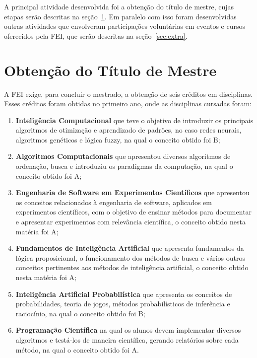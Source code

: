 \documentclass[
  12pt,       %
  oneside,
  a4paper,      %
  english,      %
  french,       %
  spanish,      %
  brazil,       %
  ]{abntex2}
\begin{document}
A principal atividade desenvolvida foi a obtenção do título de mestre, cujas etapas serão descritas na seção~\ref{sec:projeto}.
Em paralelo com isso foram desenvolvidas outras atividades que envolveram participações voluntárias em eventos e cursos oferecidos pela FEI, que serão descritas na seção~\ref{sec:extra}.

\section{Obtenção do Título de Mestre}\label{sec:projeto}

A FEI exige, para concluir o mestrado, a obtenção de seis créditos em disciplinas.
Esses créditos foram obtidas no primeiro ano, onde as disciplinas cursadas foram:
%
\begin{enumerate}
  \item \textbf{Inteligência Computacional} que teve o objetivo de introduzir os principais algoritmos de otimização e aprendizado de padrões, no caso redes neurais, algoritmos genéticos e lógica fuzzy, na qual o conceito obtido foi B;

  \item \textbf{Algoritmos Computacionais} que apresentou diversos algoritmos de ordenação, busca e introduziu os paradigmas da computação, na qual o conceito obtido foi A;

  \item \textbf{Engenharia de Software em Experimentos Científicos} que apresentou os conceitos relacionados à engenharia de software, aplicados em experimentos científicos, com o objetivo de ensinar métodos para documentar e apresentar experimentos com relevância científica, o conceito obtido nesta matéria foi A;

  \item \textbf{Fundamentos de Inteligência Artificial} que apresenta fundamentos da lógica proposicional, o funcionamento dos métodos de busca e vários outros conceitos pertinentes aos métodos de inteligência artificial, o conceito obtido nesta matéria foi A;

  \item \textbf{Inteligência Artificial Probabilística} que apresenta os conceitos de probabilidades, teoria de jogos, métodos probabilísticos de inferência e raciocínio, na qual o conceito obtido foi B;

  \item \textbf{Programação Científica} na qual os alunos devem implementar diversos algoritmos e testá-los de maneira científica, gerando relatórios sobre cada método, na qual o conceito obtido foi A.
\end{enumerate}
\end{document}
